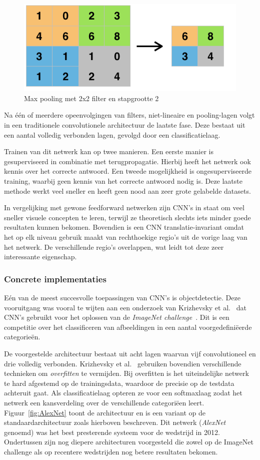 \begin{figure}[tb]
    \centering
    \includegraphics[width=0.6\linewidth]{Images/maxpool.png}
    \caption{Max pooling met 2x2 filter en stapgrootte 2}
    \label{fig:maxpool}
\end{figure}

Na \'e\'en of meerdere opeenvolgingen van filters, niet-lineaire en pooling-lagen volgt in een traditionele convolutionele architectuur de laatste fase. Deze bestaat uit een aantal volledig verbonden lagen, gevolgd door een classificatielaag.

Trainen van dit netwerk kan op twee manieren. Een eerste manier is gesuperviseerd in combinatie met terugpropagatie. Hierbij heeft het netwerk ook kennis over het correcte antwoord. Een tweede mogelijkheid is ongesuperviseerde training, waarbij geen kennis van het correcte antwoord nodig is. Deze laatste methode werkt veel sneller en heeft geen nood aan zeer grote gelabelde datasets. 

In vergelijking met gewone feedforward netwerken zijn CNN's in staat om veel sneller visuele concepten te leren, terwijl ze theoretisch slechts iets minder goede resultaten kunnen bekomen.
Bovendien is een CNN translatie-invariant omdat het op elk niveau gebruik maakt van rechthoekige regio's uit de vorige laag van het netwerk. De verschillende regio's overlappen, wat leidt tot deze zeer interessante eigenschap.

\subsubsection[]{Concrete implementaties}
E\'en van de meest succesvolle toepassingen van CNN's is objectdetectie. Deze vooruitgang was vooral te wijten aan een onderzoek van Krizhevsky et al.~\cite{Krizhevsky2012a} dat CNN's gebruikt voor het oplossen van de \emph{ImageNet challenge}~\cite{Russakovsky2014}.
Dit is een competitie over het classificeren van afbeeldingen in een aantal voorgedefini\"eerde categorie\"en. 

De voorgestelde architectuur bestaat uit acht lagen waarvan vijf convolutioneel en drie volledig verbonden. Krizhevsky et al.~\cite{Krizhevsky2012a} gebruiken bovendien verschillende technieken om \emph{overfitten} te vermijden. Bij overfitten is het uiteindelijke netwerk te hard afgestemd op de trainingsdata, waardoor de precisie op de testdata achteruit gaat. Als classificatielaag opteren ze voor een softmaxlaag zodat het netwerk een kansverdeling over de verschillende categori\"een leert. Figuur~\ref{fig:AlexNet} toont de architectuur en is een variant op de standaardarchitectuur zoals hierboven beschreven. Dit netwerk (\emph{AlexNet} genoemd) was het best presterende systeem voor de wedstrijd in 2012. Ondertussen zijn nog diepere architecturen voorgesteld die zowel op de ImageNet challenge als op recentere wedstrijden nog betere resultaten bekomen.


